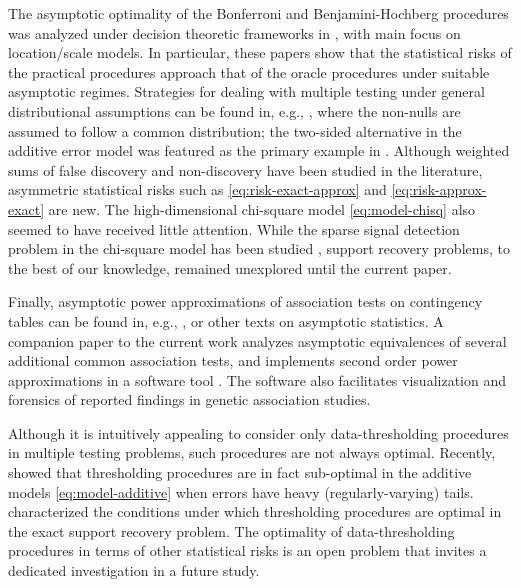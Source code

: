 The asymptotic optimality of the Bonferroni and Benjamini-Hochberg procedures 
was analyzed under decision theoretic frameworks in \cite{genovese2002operating, bogdan2011asymptotic, neuvial2012false}, with main focus on location/scale models. 
In particular, these papers show that the statistical risks of the practical procedures approach that of the oracle procedures under suitable asymptotic regimes.
Strategies for dealing with multiple testing under general distributional assumptions can be found in, e.g., \cite{efron2004large, storey2007optimal, sun2007oracle}, where the non-nulls are assumed to follow a common distribution; the two-sided alternative in the additive error model was featured as the primary example in \cite{sun2007oracle}.
Although weighted sums of false discovery and non-discovery have been studied in the literature, asymmetric statistical risks such as \eqref{eq:risk-exact-approx} and \eqref{eq:risk-approx-exact} are new.
The high-dimensional chi-square model \eqref{eq:model-chisq} also seemed to have received little attention.
While the sparse signal detection problem in the chi-square model has been studied \cite{donoho2004higher}, support recovery problems, to the best of our knowledge, remained unexplored until the current paper.

Finally, asymptotic power approximations of association tests on contingency tables can be found in, e.g., \citet{ferguson2017course}, or other texts on asymptotic statistics.
A companion paper to the current work analyzes asymptotic equivalences of several additional common association tests, and implements second order power approximations in a software tool \cite{gao2019upass}. 
The software also facilitates visualization and forensics of reported findings in genetic association studies.

\medskip

Although it is intuitively appealing to consider only data-thresholding procedures in multiple testing problems, such procedures are not always optimal.
Recently, \citet{chen2018scan} showed that thresholding procedures are in fact sub-optimal in the additive models \eqref{eq:model-additive} when errors have heavy (regularly-varying) tails. 
\citet{gao2018fundamental} characterized the conditions under which thresholding procedures are optimal in the exact support recovery problem.
The optimality of data-thresholding procedures in terms of other statistical risks is an open problem that invites a dedicated investigation in a future study. 

